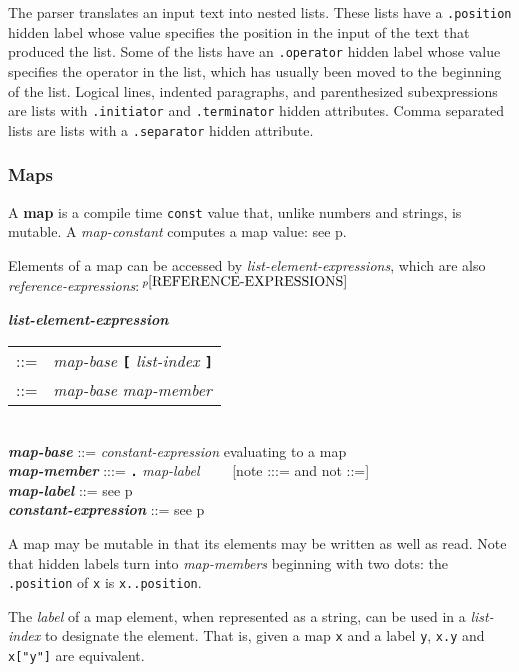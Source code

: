 \documentclass[12pt]{article}
\newcommand{\TT}[1]{{\tt \bfseries #1}}
\newcommand{\key}[1]{{\rm \bfseries #1}}
\newcommand{\emkey}[1]{{\em \bfseries #1}}
\newcommand{\pagref}[1]{p\pageref{#1}}
\newcommand{\pagnote}[1]{$\,^{p\pageref{#1}}$}
\newenvironment{indpar}[1][0.3in]%
	{\begin{list}{}%
		     {\setlength{\itemsep}{0in}%
		      \setlength{\topsep}{0in}%
		      \setlength{\parsep}{1ex}%
		      \setlength{\labelwidth}{#1}%
		      \setlength{\leftmargin}{#1}%
		      \addtolength{\leftmargin}{\labelsep}}%
	 \item}%
	{\end{list}}
\begin{document}
The parser translates an input text into nested lists.  These
lists have a {\tt .position} hidden label whose value specifies
the position in the input of the text that produced the list.
Some of the lists have an {\tt .operator} hidden label whose
value specifies the operator in the list, which has usually
been moved to the beginning of the list.  Logical lines,
indented paragraphs, and parenthesized subexpressions
are lists with {\tt .initiator} and {\tt .terminator}
hidden attributes.  Comma separated lists are lists with
a {\tt .separator} hidden attribute.

\subsubsection{Maps}
\label{MAPS}

A \key{map} is a compile time {\tt const} value that, unlike
numbers and strings, is mutable.
A {\em map-constant} computes a map value: see
\pagref{MAP-CONSTANT}.

Elements of a map can be accessed by {\em list-element-expressions}, which
are also {\em reference-expressions}:\pagnote{REFERENCE-EXPRESSIONS}

\begin{indpar}
\emkey{list-element-expression}
    \begin{tabular}[t]{rl}
    ::= & {\em map-base} \TT{[} {\em list-index} \TT{]} \\
    ::= & {\em map-base} {\em map-member} \\
    \end{tabular}
\\[0.5ex]
\emkey{map-base} ::= {\em constant-expression} evaluating to a map
\\[0.5ex]
\emkey{map-member} :::= \TT{.} {\em map-label} ~~~~[note :::= and not ::=]
\\[0.5ex]
\emkey{map-label} ::= see \pagref{MAP-LABEL}
\\[0.5ex]
\emkey{constant-expression} ::= see \pagref{CONSTANT-EXPRESSION}
\end{indpar}

A map may be mutable in that its elements may be written as well as read.
Note that hidden labels turn into {\em map-members} beginning with
two dots: the {\tt .position} of {\tt x} is {\tt x..position}.

The {\em label} of a map element, when represented as a string, can
be used in a {\em list-index} to designate the element.  That is,
given a map {\tt x} and a label {\tt y}, {\tt x.y} and {\tt x["y"]}
are equivalent.
\end{document}

